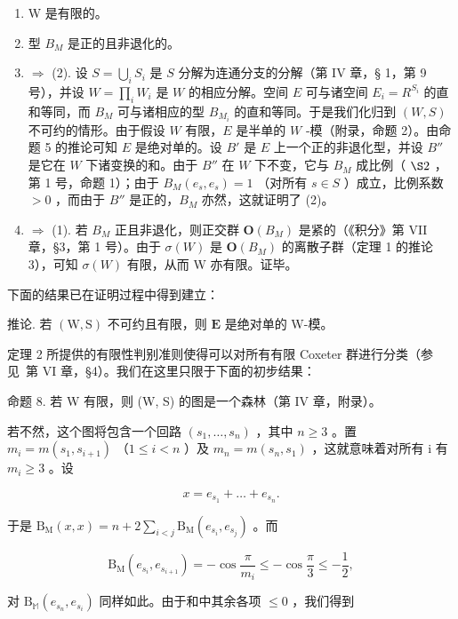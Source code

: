 \begin{enumerate}
\def\labelenumi{(\arabic{enumi})}
\item
  W 是有限的。
\item
  型 \(B_{M}\) 是正的且非退化的。
\item
  \(\Longrightarrow\) (2). 设 \(S = \bigcup_{i} S_{i}\) 是 \(S\) 分解为连通分支的分解（第 IV 章，§ 1，第 9 号），并设 \(W = \prod_{i} W_{i}\) 是 \(W\) 的相应分解。空间 \(E\) 可与诸空间 \(E_{i} = R^{S_{i}}\) 的直和等同，而 \(B_{M}\) 可与诸相应的型 \(B_{M_{i}}\) 的直和等同。于是我们化归到 \((W, S)\) 不可约的情形。由于假设 \(W\) 有限，\(E\) 是半单的 \(W\) -模（附录，命题 2）。由命题 5 的推论可知 \(E\) 是绝对单的。设 \(B'\) 是 \(E\) 上一个正的非退化型，并设 \(B''\) 是它在 \(W\) 下诸变换的和。由于 \(B''\) 在 \(W\) 下不变，它与 \(B_{M}\) 成比例（ \(\S 2\) ，第 1 号，命题 1）；由于 \(B_{M}(e_{s}, e_{s}) = 1\) （对所有 \(s \in S\) ）成立，比例系数 \(>0\) ，而由于 \(B''\) 是正的，\(B_{M}\) 亦然，这就证明了 (2)。
\item
  \(\Longrightarrow\) (1). 若 \(B_{M}\) 正且非退化，则正交群 \(\mathbf{O}(B_{M})\) 是紧的（《积分》第 VII 章，§3，第 1 号）。由于 \(\sigma(W)\) 是 \(\mathbf{O}(B_{M})\) 的离散子群（定理 1 的推论 3），可知 \(\sigma(W)\) 有限，从而 W 亦有限。证毕。
\end{enumerate}

下面的结果已在证明过程中得到建立：

推论. 若 \((\mathrm{W},\mathrm{S})\) 不可约且有限，则 \(\mathbf{E}\) 是绝对单的 W-模。

定理 2 所提供的有限性判别准则使得可以对所有有限 Coxeter 群进行分类（参见~第 VI 章，§4）。我们在这里只限于下面的初步结果：

命题 8. 若 W 有限，则 (W, S) 的图是一个森林（第 IV 章，附录）。

若不然，这个图将包含一个回路 \((s_{1},\ldots,s_{n})\) ，其中 \(n\geqslant3\) 。置 \(m_{i}=m(s_{1},s_{i+1})\) （\(1\leqslant i<n\) ）及 \(m_{n}=m(s_{n},s_{1})\) ，这就意味着对所有 i 有 \(m_{i}\geqslant3\) 。设

\[
x = e _ {s _ {1}} + \dots + e _ {s _ {n}}.
\]

于是 \(\mathrm{B_M}(x,x) = n + 2\sum_{i < j}\mathrm{B_M}(e_{s_i},e_{s_j})\) 。而

\[
\mathrm{B} _ {\mathrm{M}} (e _ {s _ {i}}, e _ {s _ {i + 1}}) = - \cos \frac {\pi}{m _ {i}} \leqslant - \cos \frac {\pi}{3} \leqslant - \frac {1}{2},
\]

对 \(\mathrm{B}_{\mathbb{M}}(e_{s_n}, e_{s_i})\) 同样如此。由于和中其余各项 \(\leqslant 0\) ，我们得到

